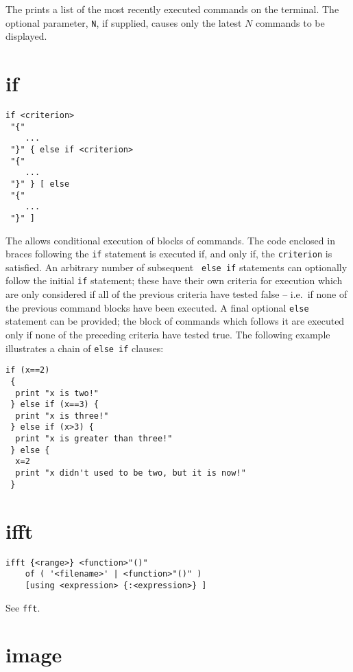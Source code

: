 The  prints a list of the most recently executed commands on
the terminal.  The optional parameter, {\tt N}, if supplied, causes only the
latest $N$ commands to be displayed.


\section{if}

\begin{verbatim}
if <criterion>
 "{"
    ...
 "}" { else if <criterion>
 "{"
    ...
 "}" } [ else
 "{"
    ...
 "}" ]
\end{verbatim}

The  allows conditional execution of blocks of commands.  The code
enclosed in braces following the {\tt if} statement is executed if, and only
if, the {\tt criterion} is satisfied.  An arbitrary number of subsequent {\tt
else if} statements can optionally follow the initial {\tt if} statement; these
have their own criteria for execution which are only considered if all of the
previous criteria have tested false -- i.e.\ if none of the previous command
blocks have been executed.  A final optional {\tt else} statement can be
provided; the block of commands which follows it are executed only if none of
the preceding criteria have tested true.  The following example illustrates a
chain of {\tt else if} clauses:

\begin{verbatim}
if (x==2)
 {
  print "x is two!"
 } else if (x==3) {
  print "x is three!"
 } else if (x>3) {
  print "x is greater than three!"
 } else {
  x=2
  print "x didn't used to be two, but it is now!"
 }
\end{verbatim}


\section{ifft}

\begin{verbatim}
ifft {<range>} <function>"()"
    of ( '<filename>' | <function>"()" )
    [using <expression> {:<expression>} ]
\end{verbatim}

See {\tt fft}.


\section{image}


